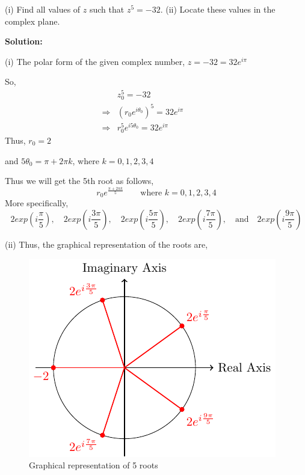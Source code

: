 \begin{ex}

\noindent (i) Find all values of $z$ such that $z^5=-32$. (ii) Locate these values in the complex plane.\par 

\noindent \textbf{Solution:} \par 
\noindent (i) The polar form of the given complex number, $\displaystyle z=-32=32e^{i\pi}$\par 
\noindent So, \begin{align*}
    &z_0^5=-32\hspace{3cm}\\
    \Rightarrow & (r_0e^{i\theta_0})^5=32e^{i\pi}\\
    \Rightarrow & r_0^5e^{i5\theta_0}=32e^{i\pi}
\end{align*}
Thus, $r_0=2$ \par 
\noindent and $5\theta_0=\pi+2\pi k$, where $k=0,1,2,3,4$\par 
\noindent Thus we will get the 5th root as follows, 
$$r_0e^{\frac{\pi+2\pi k}{5}} \quad \quad \text{where }k=0,1,2,3,4$$
More specifically, 
$$2exp\left(i\frac{\pi}{5}\right),\quad 2exp\left(i\frac{3\pi}{5}\right),\quad 2exp\left(i\frac{5\pi}{5}\right),\quad 2exp\left(i\frac{7\pi}{5}\right),\quad \text{and}\quad 2exp\left(i\frac{9\pi}{5}\right)$$
\end{ex}
\noindent (ii) Thus, the graphical representation of the roots are, \\
\begin{figure}[!ht]
    \centering
    \includegraphics{FIG_MAT215/FIG6.pdf}
    \caption{Graphical representation of 5 roots}
    \label{fig6}
\end{figure}
\FloatBarrier
